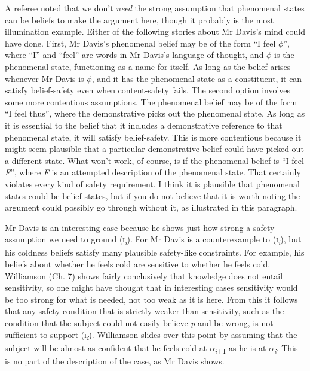 A referee noted that we don't \textit{need} the strong assumption that phenomenal states can be beliefs to make the argument here, though it probably is the most illumination example. Either of the following stories about Mr Davis's mind could have done. First, Mr Davis's phenomenal belief may be of the form ``I feel ${\phi}$'', where ``I'' and ``feel'' are words in Mr Davis's language of thought, and ${\phi}$ is the phenomenal state, functioning as a name for itself. As long as the belief arises whenever Mr Davis is ${\phi}$, and it has the phenomenal state as a constituent, it can satisfy belief-safety even when content-safety fails. The second option involves some more contentious assumptions. The phenomenal belief may be of the form ``I feel thus'', where the demonstrative picks out the phenomenal state. As long as it is essential to the belief that it includes a demonstrative reference to that phenomenal state, it will satisfy belief-safety. This is more contentious because it might seem plausible that a particular demonstrative belief could have picked out a different state. What won't work, of course, is if the phenomenal belief is ``I feel \textit{F}'', where \textit{F} is an attempted description of the phenomenal state. That certainly violates every kind of safety requirement. I think it is plausible that phenomenal states could be belief states, but if you do not believe that it is worth noting the argument could possibly go through without it, as illustrated in this paragraph.

Mr Davis is an interesting case because he shows just how strong a safety assumption we need to ground (\textsc{i}\textit{\textsubscript{i}}). For Mr Davis is a counterexample to (\textsc{i}\textit{\textsubscript{i}}), but his coldness beliefs satisfy many plausible safety-like constraints. For example, his beliefs about whether he feels cold are sensitive to whether he feels cold. Williamson (Ch. 7) shows fairly conclusively that knowledge does not entail sensitivity, so one might have thought that in interesting cases sensitivity would be too strong for what is needed, not too weak as it is here. From this it follows that any safety condition that is strictly weaker than sensitivity, such as the condition that the subject could not easily believe \textit{p} and be wrong, is not sufficient to support (\textsc{i}\textit{\textsubscript{i}}). Williamson slides over this point by assuming that the subject will be almost as confident that he feels cold at ${\alpha}$\textit{\textsubscript{i}}\textsubscript{+1} as he is at ${\alpha}$\textit{\textsubscript{i}}. This is no part of the description of the case, as Mr Davis shows. 

